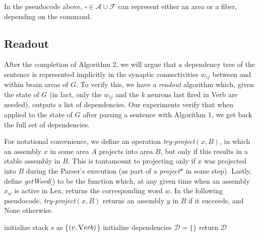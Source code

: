 \documentclass[11pt,a4paper]{article}
\begin{document}
In the pseudocode above, $\square \in \mathcal{A}\cup \mathcal{F}$ can represent either an area or a fiber, depending on the command. 

\subsection{Readout}
After the completion of Algorithm 2, we will argue that a dependency tree of the sentence is represented implicitly in the synaptic connectivities $w_{ij}$ between and within brain areas of $G$. To verify this, we have a {\em readout} algorithm which, given the state of $G$ (in fact, only the $w_{ij}$ and the $k$ neurons last fired in {\sc Verb} are needed), outputs a list of dependencies. Our experiments verify that when applied to the state of $G$ after parsing a sentence with Algorithm 1, we get back the full set of dependencies. 

For notational convenience, we define an operation {\em try-project$(x,B)$}, in which an assembly $x$ in some area $A$ projects into area $B$, but only if this results in a stable assembly in $B$. This is tantamount to projecting only if $x$ was projected into $B$ during the Parser's execution (as part of a {\em project}* in some step). Lastly, define {\em getWord}() to be the function which, at any given time when an assembly $x_w$ is active in {\sc Lex}, returns the corresponding word $w$. In the following pseudocode, {\em try-project}$(x,B)$ returns an assembly $y$ in $B$ if it succeeds, and {\sc None} otherwise.

\begin{algorithm}
\BlankLine
initialize stack $s$ as \{$(v,{\textsc Verb})$\} \;
initialize dependencies $\mathcal{D} = \{\}$ \;
 return $\mathcal{D}$ \;
 \caption{Read out of parse tree in $G$}
\end{algorithm}
\end{document}
